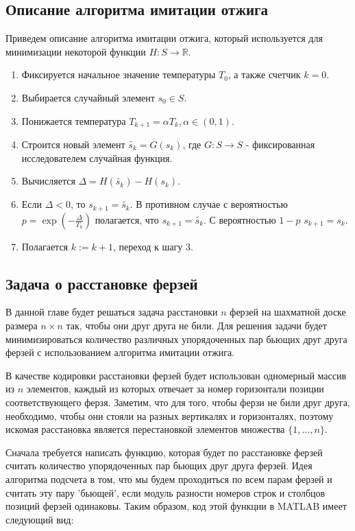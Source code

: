 \documentclass[../main.tex]{subfiles}
\begin{document}
	\subsection{Описание алгоритма имитации отжига}
	Приведем описание алгоритма имитации отжига, который используется для минимизации некоторой функции $H: S \rightarrow \mathbb{R}$.
	\begin{enumerate}
		\item Фиксируется начальное значение температуры $T_0$, а также счетчик $k = 0$. 
		\item Выбирается случайный элемент $s_0 \in S$.
		\item  Понижается температура $T_{k+1} = \alpha T_k, \alpha \in (0, 1)$.
		\item Строится новый элемент $\tilde{s_k} = G(s_k)$, где $G: S \rightarrow S$ - фиксированная исследователем случайная функция.
		\item Вычисляется $\Delta = H(\tilde{s_k}) - H(s_k)$. 
		\item Если $\Delta < 0$, то $s_{k+1} = \tilde{s_k}$. В противном случае с вероятностью $p = \exp{(-\frac{\Delta}{T_k})}$ полагается, что $s_{k+1} = \tilde{s_k}$. С вероятностью $1 - p$  $s_{k+1} = s_k$.
		\item Полагается $k := k + 1$, переход к шагу 3.
		
	\end{enumerate}
	
	
	\subsection{Задача о расстановке ферзей}
	В данной главе будет решаться задача расстановки $n$ ферзей на шахматной доске размера $n\times n$ так, чтобы они друг друга не били. Для решения задачи будет минимизироваться количество различных упорядоченных пар бьющих друг друга ферзей с использованием алгоритма имитации отжига. 
	
	В качестве кодировки расстановки ферзей будет использован одномерный массив из $n$ элементов, каждый из которых отвечает за номер горизонтали позиции соответствующего ферзя. Заметим, что для того, чтобы ферзи не били друг друга, необходимо, чтобы они стояли на разных вертикалях и горизонталях, поэтому искомая расстановка является перестановкой элементов множества $\{1, \dots, n\}$.
	
	Сначала требуется написать функцию, которая будет по расстановке ферзей считать количество упорядоченных пар бьющих друг друга ферзей. Идея алгоритма подсчета в том, что мы будем проходиться по всем парам ферзей и считать эту пару 'бьющей', если модуль разности номеров строк и столбцов позиций ферзей одинаковы. Таким образом, код этой функции в MATLAB имеет следующий вид:
	
\end{document}
